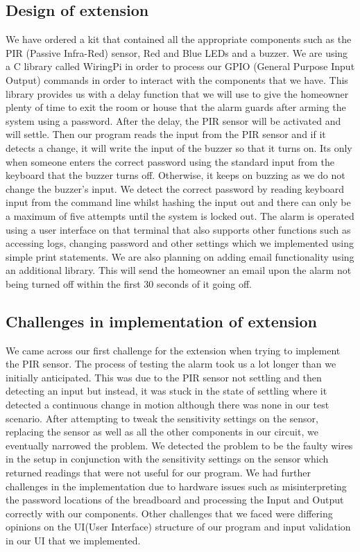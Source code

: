 \documentclass[11pt]{article}
\begin{document}
\subsection{Design of extension}
We have ordered a kit that contained all the appropriate components such as the PIR (Passive Infra-Red) sensor, Red and Blue LEDs and a buzzer. We are using a C library called WiringPi in order to process our GPIO (General Purpose Input Output) commands in order to interact with the components that we have.  This library provides us with a delay function that we will use to give the homeowner plenty of time to exit the room or house that the alarm guards after arming the system using a password. After the delay, the PIR sensor will be activated and will settle. Then our program reads the input from the PIR sensor and if it detects a change, it will write the input of the buzzer so that it turns on. Its only when someone enters the correct password using the standard input from the keyboard that the buzzer turns off. Otherwise, it keeps on buzzing as we do not change the buzzer's input. We detect the correct password by reading keyboard input from the command line whilst hashing the input out and there can only be a maximum of five attempts until the system is locked out. The alarm is operated using a user interface on that terminal that also supports other functions such as accessing logs, changing password and other settings which we implemented using simple print statements. We are also planning on adding email functionality using an additional library. This will send the homeowner an email upon the alarm not being turned off within the first 30 seconds of it going off. 

\subsection{Challenges in implementation of extension}
We came across our first challenge for the extension when trying to implement the PIR sensor. The process of testing the alarm took us a lot longer than we initially anticipated. This was due to the PIR sensor not settling and then detecting an input but instead, it was stuck in the state of settling where it detected a continuous change in motion although there was none in our test scenario. After attempting to tweak the sensitivity settings on the sensor, replacing the sensor as well as all the other components in our circuit, we eventually narrowed the problem. We detected the problem to be the faulty wires in the setup in conjunction with the sensitivity settings on the sensor which returned readings that were not useful for our program. We had further challenges in the implementation due to hardware issues such as misinterpreting the password locations of the breadboard and processing the Input and Output correctly with our components. Other challenges that we faced were differing opinions on the UI(User Interface) structure of our program and input validation in our UI that we implemented. 
\end{document}
